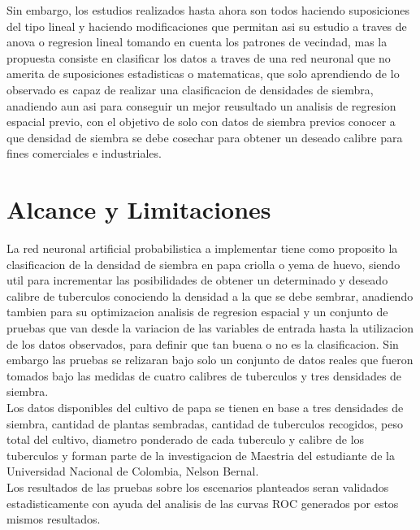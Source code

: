 Sin embargo, los estudios realizados hasta ahora son todos haciendo suposiciones del tipo lineal y haciendo modificaciones que permitan asi su estudio a traves de anova o regresion lineal tomando en cuenta los patrones de vecindad, mas la propuesta consiste en clasificar los datos a traves de una red neuronal que no amerita de suposiciones estadisticas o matematicas, que solo aprendiendo de lo observado es capaz de realizar una clasificacion de densidades de siembra, anadiendo aun asi para conseguir un mejor reusultado un analisis de regresion espacial previo, con el objetivo de solo con datos de siembra previos conocer a que densidad de siembra se debe cosechar para obtener un deseado calibre para fines comerciales e industriales. 

\section{Alcance y Limitaciones}

La red neuronal artificial probabilistica a implementar tiene como proposito la clasificacion de la densidad de siembra en papa criolla o yema de huevo, siendo util para incrementar las posibilidades de obtener un determinado y deseado calibre de tuberculos conociendo la densidad a la que se debe sembrar, anadiendo tambien para su optimizacion analisis de regresion espacial y un conjunto de pruebas que van desde la variacion de las variables de entrada hasta la utilizacion de los datos observados, para definir que tan buena o no es la clasificacion. Sin embargo las pruebas se relizaran bajo solo un conjunto de datos reales que fueron tomados bajo las medidas de cuatro calibres de tuberculos y tres densidades de siembra. \\

Los datos disponibles del cultivo de papa se tienen en base a tres densidades de siembra, cantidad de plantas sembradas, cantidad de tuberculos recogidos, peso total del cultivo, diametro ponderado de cada tuberculo y calibre de los tuberculos y forman parte de la investigacion de Maestria del estudiante de la Universidad Nacional de Colombia, Nelson Bernal.\\

Los resultados de las pruebas sobre los escenarios planteados seran validados estadisticamente con ayuda del analisis de las curvas ROC generados por estos mismos resultados.\\
